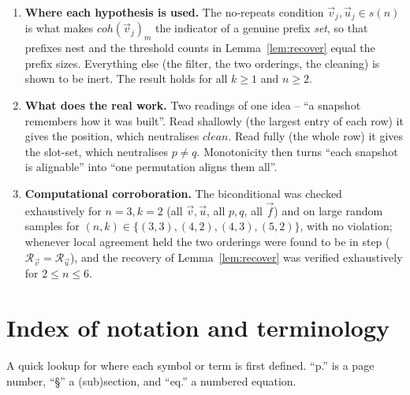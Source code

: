 \documentclass{article}
\begin{document}
\begin{enumerate}
\item \textbf{Where each hypothesis is used.}  The no-repeats condition
$\vec v_j,\vec u_j\in s(n)$ is what makes $coh(\vec v_j)_m$ the indicator of a
genuine prefix \emph{set}, so that prefixes nest and the threshold counts in
Lemma~\ref{lem:recover} equal the prefix sizes.  Everything else (the filter, the
two orderings, the cleaning) is shown to be inert.  The result holds for all
$k\ge1$ and $n\ge2$.

\item \textbf{What does the real work.}  Two readings of one idea -- ``a snapshot
remembers how it was built''.  Read shallowly (the largest entry of each row) it
gives the position, which neutralises $clean$.  Read fully (the whole row) it gives
the slot-set, which neutralises $p\neq q$.  Monotonicity then turns ``each snapshot
is alignable'' into ``one permutation aligns them all''.

\item \textbf{Computational corroboration.}  The biconditional was checked
exhaustively for $n=3,k=2$ (all $\vec v,\vec u$, all $p,q$, all $\vec f$) and on
large random samples for $(n,k)\in\{(3,3),(4,2),(4,3),(5,2)\}$, with no violation;
whenever local agreement held the two orderings were found to be in step
($\mathcal R_{\vec v}=\mathcal R_{\vec u}$), and the recovery of
Lemma~\ref{lem:recover} was verified exhaustively for $2\le n\le 6$.
\end{enumerate}


\section*{Index of notation and terminology}

A quick lookup for where each symbol or term is first defined.  ``p.'' is a page
number, ``\S'' a (sub)section, and ``eq.'' a numbered equation.
\end{document}
